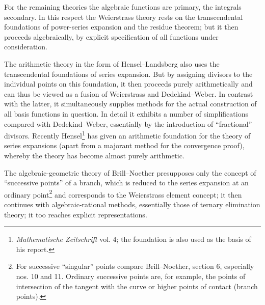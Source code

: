 \documentclass[11pt]{article}
\begin{document}
For the remaining theories the algebraic functions are primary, the integrals secondary. In this respect the Weierstrass theory rests on the transcendental foundations of power-series expansion and the residue theorem; but it then proceeds algebraically, by explicit specification of all functions under consideration.

The arithmetic theory in the form of Hensel--Landsberg also uses the transcendental foundations of series expansion. But by assigning divisors to the individual points on this foundation, it then proceeds purely arithmetically and can thus be viewed as a fusion of Weierstrass and Dedekind--Weber. In contrast with the latter, it simultaneously supplies methods for the actual construction of all basis functions in question. In detail it exhibits a number of simplifications compared with Dedekind--Weber, essentially by the introduction of ``fractional'' divisors. Recently Hensel\footnote{\emph{Mathematische Zeitschrift} vol. 4; the foundation is also used as the basis of his report.} has given an arithmetic foundation for the theory of series expansions (apart from a majorant method for the convergence proof), whereby the theory has become almost purely arithmetic.

The algebraic-geometric theory of Brill--Noether presupposes only the concept of ``successive points'' of a branch, which is reduced to the series expansion at an ordinary point\footnote{For successive ``singular'' points compare Brill--Noether, section 6, especially nos. 10 and 11. Ordinary successive points are, for example, the points of intersection of the tangent with the curve or higher points of contact (branch points).} and corresponds to the Weierstrass element concept; it then continues with algebraic-rational methods, essentially those of ternary elimination theory; it too reaches explicit representations.
\end{document}
